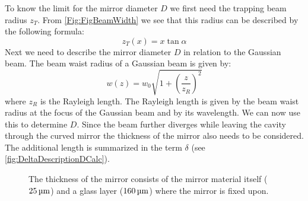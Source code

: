 To know the limit for the mirror diameter $D$ we first need the trapping beam radius $z_{\si{T}}$. From \autoref{Fig:FigBeamWidth} we see that this radius can be described by the following formula:
\begin{equation}\label{EqTrapRadius}
	z_{\si{T}}(x)=x\tan\alpha
\end{equation}
Next we need to describe the mirror diameter $D$ in relation to the Gaussian beam. The beam waist radius of a Gaussian beam is given by:
\begin{equation}
	w(z)=w_0\sqrt{1+\left(\frac{z}{z_{{\si{R}}}}\right)^2}
\end{equation}
where $z_{\si{R}}$ is the Rayleigh length. The Rayleigh length is given by the beam waist radius at the focus of the Gaussian beam and by its wavelength. We can now use this to determine $D$. Since the beam further diverges while leaving the cavity through the curved mirror the thickness of the mirror also needs to be considered. The additional length is summarized in the term $\delta$ (see \autoref{fig:DeltaDescriptionDCalc}).
\begin{figure}[H]
	
	\caption{The thickness of the mirror consists of the mirror material itself ($25\um$) and a glass layer ($160\um$) where the mirror is fixed upon.}
	\label{fig:DeltaDescriptionDCalc}
\end{figure}

